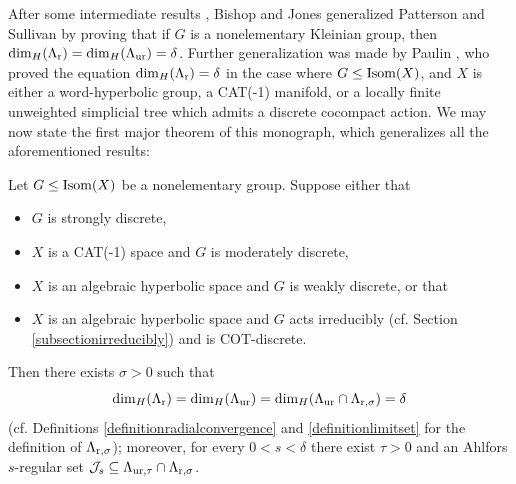 After some intermediate results \cite{FernandezMelian,Stratmann1}, Bishop and Jones \cite[Theorem 1]{BishopJones} generalized Patterson and Sullivan by proving that if $G$ is a nonelementary Kleinian group, then ${\dim_H}(\Lambda_{\mathrm r}) = {\dim_H}(\Lambda_{\mathrm{ur}}) = \delta$. Further generalization was made by Paulin \cite{Paulin}, who proved the equation ${\dim_H}(\Lambda_{\mathrm r}) = \delta$ in the case where $G\leq\operatorname{Isom}(X)$, and $X$ is either a word-hyperbolic group, a CAT(-1) manifold, or a locally finite unweighted simplicial tree which admits a discrete cocompact action. We may now state the first major theorem of this monograph, which generalizes all the aforementioned results:


\begin{theorem}
\label{theorembishopjonesregular}
Let $G\leq\operatorname{Isom}(X)$ be a nonelementary group. Suppose either that
\begin{itemize}
\item[(1)] $G$ is strongly discrete,
\item[(2)] $X$ is a CAT(-1) space and $G$ is moderately discrete,
\item[(3)] $X$ is an algebraic hyperbolic space and $G$ is weakly discrete, or that
\item[(4)] $X$ is an algebraic hyperbolic space and $G$ acts irreducibly (cf. Section \ref{subsectionirreducibly}) and is COT-discrete.
\end{itemize}
Then there exists $\sigma > 0$ such that
\begin{equation}
\label{bishopjonesregular}
{\dim_H}(\Lambda_{\mathrm r}) = {\dim_H}(\Lambda_{\mathrm{ur}}) = {\dim_H}(\Lambda_{\mathrm{ur}}\cap\Lambda_{\mathrm r,\sigma}) = \delta
\end{equation}
(cf. Definitions \ref{definitionradialconvergence} and \ref{definitionlimitset} for the definition of $\Lambda_{\mathrm r,\sigma}$); moreover, for every $0 < s < \delta$ there exist $\tau > 0$ and an Ahlfors $s$-regular set $\mathcal J_s\subseteq\Lambda_{\mathrm{ur},\tau}\cap\Lambda_{\mathrm r,\sigma}$.
\end{theorem}

